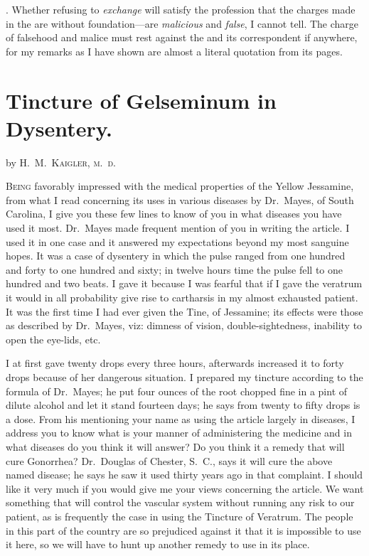 . Whether refusing to \emph{exchange} will
satisfy the profession that the charges made in the  are without
foundation---are \emph{malicious} and \emph{false}, I cannot tell. The charge of falsehood
and malice must rest against the  and its correspondent
if anywhere, for my remarks as I have shown are almost a literal quotation
from its pages.

\section*{Tincture of Gelseminum in Dysentery.}

by \textsc{H.~M.~Kaigler, m.~d.}

\lettrine[lines=1]{}{Being} favorably impressed with the medical properties of the Yellow
Jessamine, from what I read concerning its uses in various diseases by
Dr.~Mayes, of South Carolina, I give you these few lines to know of
you in what diseases you have used it most. Dr.~Mayes made frequent
mention of you in writing the article. I used it in one case and it answered
my expectations beyond my most sanguine hopes. It was a case
of dysentery in which the pulse ranged from one hundred and forty to
one hundred and sixty; in twelve hours time the pulse fell to one hundred
and two beats. I gave it because I was fearful that if I gave the
veratrum it would in all probability give rise to cartharsis in my almost
exhausted patient. It was the first time I had ever given the Tine, of
Jessamine; its effects were those as described by Dr.~Mayes, viz: dimness
of vision, double-sightedness, inability to open the eye-lids, etc.

I at first gave twenty drops every three hours, afterwards increased it
to forty drops because of her dangerous situation. I prepared my tincture
according to the formula of Dr.~Mayes; he put four ounces of the
root chopped fine in a pint of dilute alcohol and let it stand fourteen days;
he says from twenty to fifty drops is a dose. From his mentioning your
name as using the article largely in diseases, I address you to know
what is your manner of administering the medicine and in what diseases
do you think it will answer? Do you think it a remedy that will
cure Gonorrhea? Dr.~Douglas of Chester, S.~C., says it will cure the above
named disease; he says he saw it used thirty years ago in that complaint.
I should like it very much if you would give me your views concerning
the article. We want something that will control the vascular system
without running any risk to our patient, as is frequently the case in
using the Tincture of Veratrum. The people in this part of the country
are so prejudiced against it that it is impossible to use it here, so we will
have to hunt up another remedy to use in its place.\endinput

